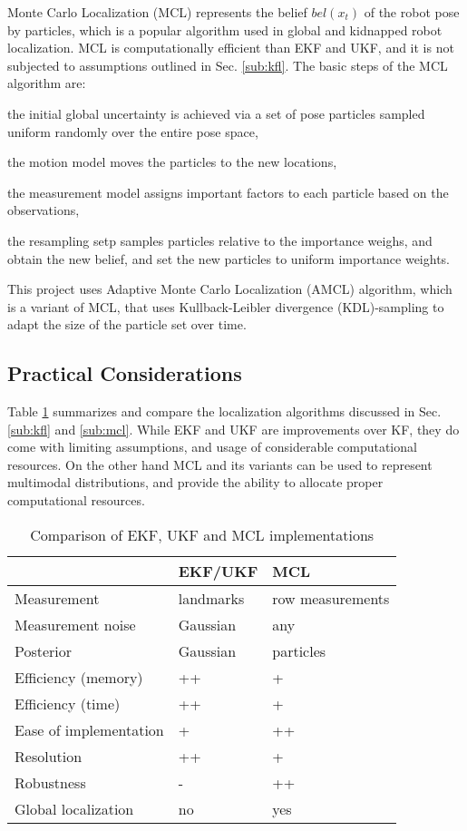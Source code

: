 \documentclass[10pt,journal,compsoc]{IEEEtran}
\begin{document}
Monte Carlo Localization (MCL) represents the belief $bel(x_t)$ of the robot pose by particles, which is a popular algorithm used in global and kidnapped robot localization.  MCL is computationally efficient than EKF and UKF, and it is not subjected to assumptions outlined in Sec. \ref{sub:kfl}. The basic steps of the MCL algorithm are:   \begin{enumerate*} \item the initial global uncertainty is achieved via a set of pose particles sampled uniform randomly over the entire pose space, \item the motion model moves the particles to the new locations, \item the measurement model assigns important factors to each particle based on the observations, \item the resampling setp samples particles relative to the importance weighs, and obtain the new belief, and set the new particles to uniform importance weights.  \end{enumerate*}

This project uses Adaptive Monte Carlo Localization  (AMCL) algorithm, which is a variant of MCL, that uses Kullback-Leibler divergence (KDL)-sampling to adapt the size of the particle set over time. 

\subsection{Practical Considerations}

Table \ref{tab:comp} summarizes and compare the localization algorithms discussed in Sec. \ref{sub:kfl} and \ref{sub:mcl}. While EKF and UKF are improvements over KF, they do come with limiting assumptions, and usage of considerable computational resources. On the other hand MCL and its variants can be used to represent multimodal distributions, and provide the ability to allocate proper computational resources.    

\begin{table}[h]
\caption{Comparison of EKF, UKF and MCL implementations}
\label{tab:comp}
\begin{center}
\begin{tabular}{|l||l|l|}
\hline
& EKF/UKF & MCL\\
\hline
Measurement & landmarks & row measurements\\
Measurement noise  & Gaussian & any\\
Posterior & Gaussian & particles\\
Efficiency (memory) & ++ &+\\
Efficiency (time) & ++ & +\\
Ease of implementation & + & ++\\
Resolution & ++ & +\\
Robustness & - & ++\\
Global localization & no & yes\\
\hline
\end{tabular}
\end{center}
\end{table}
\end{document}

